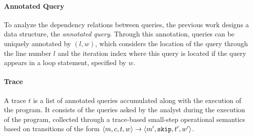  \paragraph*{Annotated Query} 
 To analyze the dependency relations between queries, the previous work
 designs a data structure, the \emph{annotated query}. 
Through this annotation, queries can be uniquely annotated 
 by $(l,w)$, which considers the location of the query
 through the line number $l$ and
 the iteration index where this query is located
 if the query appears in a loop statement, specified by $w$.
\paragraph{Trace} 
A trace $t$ is a list of annotated queries accumulated along with the execution of the program. 
 It consists of the queries asked by the analyst during the execution of the program,
collected through
 a trace-based small-step operational semantics based on transitions of the form $ \langle m,c, t, w \rangle \to \langle m', \mathtt{skip}, t', w' \rangle $.
